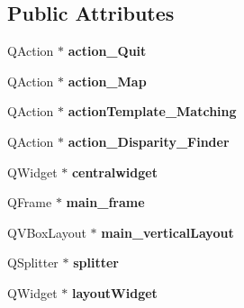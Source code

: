 \subsection*{Public Attributes}
\begin{DoxyCompactItemize}
\item 
\hypertarget{classUi__QcorrClass_ae725a71d3bb44a43e2d65ce4d1284b85}{
QAction $\ast$ {\bfseries action\_\-Quit}}
\label{classUi__QcorrClass_ae725a71d3bb44a43e2d65ce4d1284b85}

\item 
\hypertarget{classUi__QcorrClass_aa2e514c1c784f746eec5abed0bf57190}{
QAction $\ast$ {\bfseries action\_\-Map}}
\label{classUi__QcorrClass_aa2e514c1c784f746eec5abed0bf57190}

\item 
\hypertarget{classUi__QcorrClass_a34a38652dc16add16ee2ca325c1e4b31}{
QAction $\ast$ {\bfseries actionTemplate\_\-Matching}}
\label{classUi__QcorrClass_a34a38652dc16add16ee2ca325c1e4b31}

\item 
\hypertarget{classUi__QcorrClass_af3eff626499d6ad7b19db0a828a5794a}{
QAction $\ast$ {\bfseries action\_\-Disparity\_\-Finder}}
\label{classUi__QcorrClass_af3eff626499d6ad7b19db0a828a5794a}

\item 
\hypertarget{classUi__QcorrClass_a885bdbbc4267078f102878ad126b23bb}{
QWidget $\ast$ {\bfseries centralwidget}}
\label{classUi__QcorrClass_a885bdbbc4267078f102878ad126b23bb}

\item 
\hypertarget{classUi__QcorrClass_acb93f5008511c2654ac8a51c17dc11ef}{
QFrame $\ast$ {\bfseries main\_\-frame}}
\label{classUi__QcorrClass_acb93f5008511c2654ac8a51c17dc11ef}

\item 
\hypertarget{classUi__QcorrClass_afd1d2aad88a740a9f33d9f91370c7ea9}{
QVBoxLayout $\ast$ {\bfseries main\_\-verticalLayout}}
\label{classUi__QcorrClass_afd1d2aad88a740a9f33d9f91370c7ea9}

\item 
\hypertarget{classUi__QcorrClass_ab4e96571e7dd58d9ec798cf6ede3cbe6}{
QSplitter $\ast$ {\bfseries splitter}}
\label{classUi__QcorrClass_ab4e96571e7dd58d9ec798cf6ede3cbe6}

\item 
\hypertarget{classUi__QcorrClass_a81e59812852e521cced5e1f912bffb99}{
QWidget $\ast$ {\bfseries layoutWidget}}
\label{classUi__QcorrClass_a81e59812852e521cced5e1f912bffb99}


\end{DoxyCompactItemize}
